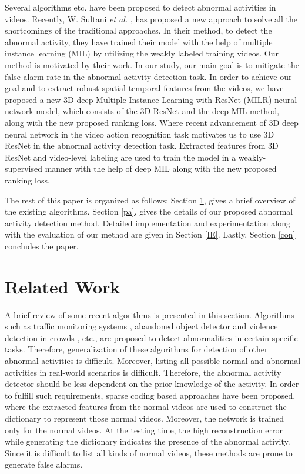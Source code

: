 \documentclass[conference]{IEEEtran}
\begin{document}
Several algorithms \cite{A2,A3,A6,A9,A11,A15,A16,A17,A18,A19,A20,A21} etc. have been proposed to detect abnormal activities in videos. Recently, W. Sultani \textit{et al.} \cite{A6}, has proposed a new approach to solve all the shortcomings of the traditional approaches. In their method, to detect the abnormal activity, they have trained their model with the help of multiple instance learning (MIL) \cite{A12, A24} by utilizing the weakly labeled training videos. Our method is motivated by their work. In our study, our main goal is to mitigate the false alarm rate in the abnormal activity detection task. In order to achieve our goal and to extract robust spatial-temporal features from the videos, we have proposed a new 3D deep Multiple Instance Learning with ResNet (MILR) neural network model, which consists of the 3D ResNet \cite{A5,A13} and the deep MIL \cite{A12,A6} method, along with the new proposed ranking loss. Where recent advancement of 3D deep neural network in the video action recognition task motivates us to use 3D ResNet \cite{A5,A13} in the abnormal activity detection task. Extracted features from 3D ResNet and video-level labeling are used to train the model in a weakly-supervised manner with the help of deep MIL \cite{A12, A6} along with the new proposed ranking loss. 

The rest of this paper is organized as follows: Section \ref{RelW}, gives a brief overview of the existing algorithms. Section \ref{pa}, gives the details of our proposed abnormal activity detection method. Detailed implementation and experimentation along with the evaluation of our method are given in Section \ref{IE}. Lastly, Section \ref{con} concludes the paper.

\section{Related Work} \label{RelW}

A brief review of some recent algorithms is presented in this section. Algorithms such as traffic monitoring systems \cite{A2,A3,A20}, abandoned object detector \cite{A7} and violence detection in crowds \cite{A19}, etc., are proposed to detect abnormalities in certain specific tasks. Therefore, generalization of these algorithms for detection of other abnormal activities is difficult. Moreover, listing all possible normal and abnormal activities in real-world scenarios is difficult. Therefore, the abnormal activity detector should be less dependent on the prior knowledge of the activity. In order to fulfill such requirements, sparse coding based approaches \cite{A18,A9} have been proposed, where the extracted features from the normal videos are used to construct the dictionary to represent those normal videos. Moreover, the network is trained only for the normal videos. At the testing time, the high reconstruction error while generating the dictionary indicates the presence of the abnormal activity. Since it is difficult to list all kinds of normal videos, these methods are prone to generate false alarms.
\end{document}
